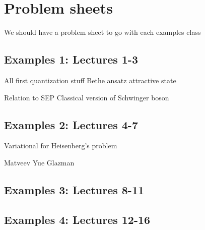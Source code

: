 \section{Problem sheets}

We should have a problem sheet to go with each examples class


\subsection{Examples 1: Lectures 1-3}

All first quantization stuff
Bethe ansatz attractive state


Relation to SEP
Classical version of Schwinger boson

\subsection{Examples 2: Lectures 4-7}


Variational for Heisenberg's problem

Matveev Yue Glazman

\subsection{Examples 3: Lectures 8-11}

\subsection{Examples 4: Lectures 12-16}
